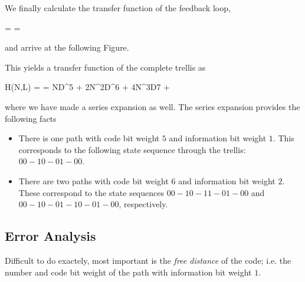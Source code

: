 We finally calculate the transfer function of the feedback loop,

\bee
{} =  = 
\eee

 and arrive at the following Figure.

\vspace*{7mm}


This yields a transfer function of the complete trellis as

\bee
H(N,L) =  = ND^5 + 2N^2D^6 + 4N^3D7 + \cdots
\eee

where we have made a series expansion as well. The series expansion provides the following facts

\begin{itemize}

\item There is one path with code bit weight $5$ and information bit weight $1$. This corresponds to the following state sequence through the trellis: $00-10-01-00$.

\item  There are two paths with code bit weight $6$ and information bit weight $2$. These correspond to the state sequences $00-10-11-01-00$ and $00-10-01-10-01-00$, respectively.

\end{itemize}

\subsection{Error Analysis}

Difficult to do exactely, most important is the \emph{free distance} of the code; i.e. the number and code bit weight of the path with information bit weight $1$.


